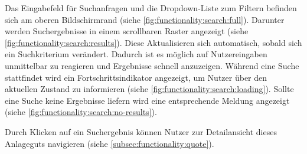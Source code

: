 \documentclass[a4paper]{article}
\begin{document}
Das Eingabefeld für Suchanfragen und die Dropdown-Liste zum Filtern befinden sich am oberen Bildschirmrand (siehe \autoref{fig:functionality:search:full}).
Darunter werden Suchergebnisse in einem scrollbaren Raster angezeigt (siehe \autoref{fig:functionality:search:results}).
Diese Aktualisieren sich automatisch, sobald sich ein Suchkriterium verändert.
Dadurch ist es möglich auf Nutzereingaben unmittelbar zu reagieren und Ergebnisse schnell anzuzeigen.
Während eine Suche stattfindet wird ein Fortschritts\-indikator angezeigt, um Nutzer über den aktuellen Zustand zu informieren (siehe \autoref{fig:functionality:search:loading}).
Sollte eine Suche keine Ergebnisse liefern wird eine entsprechende Meldung angezeigt (siehe \autoref{fig:functionality:search:no-results}).

Durch Klicken auf ein Suchergebnis können Nutzer zur Detailansicht dieses Anlageguts navigieren (siehe \autoref{subsec:functionality:quote}).
\end{document}
